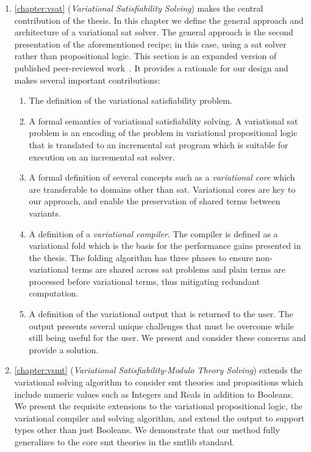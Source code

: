 \begin{enumerate}
  \item \autoref{chapter:vsat} (\emph{Variational Satisfiability Solving}) makes
    the central contribution of the thesis. In this chapter we define the
    general approach and architecture of a variational \ac{sat} solver. The
    general approach is the second presentation of the aforementioned recipe; in
    this case, using a \ac{sat} solver rather than propositional logic. This
    section is an expanded version of published peer-reviewed
    work~\cite{YWT:SPLC20}. It provides a rationale for our design and makes
    several important contributions:
    \begin{enumerate}
    \item The definition of the variational satisfiability problem.
    \item A formal semantics of variational satisfiability solving. A
      variational \ac{sat} problem is an encoding of the problem in variational
      propositional logic that is translated to an incremental \ac{sat} program
      which is suitable for execution on an incremental \ac{sat} solver.
    \item A formal definition of several concepts such as a \emph{variational
        core} which are transferable to domains other than \ac{sat}. Variational
      cores are key to our approach, and enable the preservation of shared terms
      between variants.
    \item A definition of a \emph{variational compiler}. The compiler is defined
      as a variational fold which is the basis for the performance gains
      presented in the thesis. The folding algorithm has three phases to ensure
      non-variational terms are shared across \ac{sat} problems and plain terms
      are processed before variational terms, thus mitigating redundant
      computation.
    \item A definition of the variational output that is returned to the user.
      The output presents several unique challenges that must be overcome while
      still being useful for the user. We present and consider these
      concerns and provide a solution.
    \end{enumerate}

  \item \autoref{chapter:vsmt} (\emph{Variational Satisfiability-Modulo Theory
      Solving}) extends the variational solving algorithm to consider \ac{smt}
    theories and propositions which include numeric values such as Integers and
    Reals in addition to Booleans. We present the requisite extensions to the
    variational propositional logic, the variational compiler and solving
    algorithm, and extend the output to support types other than just Booleans.
    We demonstrate that our method fully generalizes to the core \ac{smt}
    theories in the \acl{smtlib} standard.


\end{enumerate}

